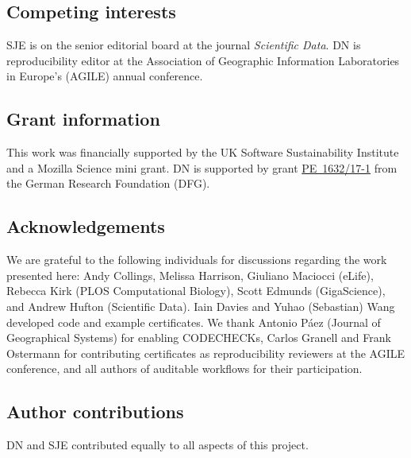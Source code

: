 \documentclass[12pt]{article}
\begin{document}
\subsection*{Competing interests}

SJE is on the senior editorial board at the journal \emph{Scientific
Data}.
DN is reproducibility editor at the Association of Geographic Information 
Laboratories in Europe's (AGILE) annual conference.

\subsection*{Grant information}

This work was financially supported by the UK Software
Sustainability Institute and a Mozilla Science mini grant.
DN is supported by grant
\href{https://gepris.dfg.de/gepris/projekt/415851837}{PE~1632/17-1}
from the German Research Foundation (DFG).

\subsection*{Acknowledgements}\label{acknowledgements}

We are grateful to the following individuals for discussions regarding
the work presented here: Andy Collings, Melissa Harrison, Giuliano
Maciocci (eLife), Rebecca Kirk (PLOS Computational Biology), Scott
Edmunds (GigaScience), and Andrew Hufton (Scientific Data). Iain Davies and
Yuhao (Sebastian) Wang developed code and example certificates.
We thank Antonio P\'{a}ez (Journal of Geographical Systems) for enabling
CODECHECKs, Carlos Granell and Frank Ostermann for contributing
certificates as reproducibility reviewers at the AGILE conference, and 
all authors of auditable workflows for their participation.

\subsection*{Author contributions}

DN and SJE contributed equally to all aspects of this project.

{\small
}
\end{document}
